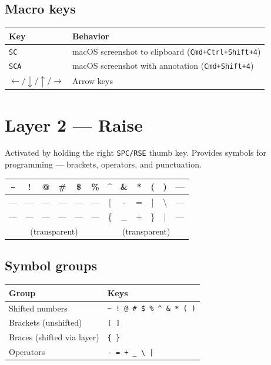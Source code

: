 \documentclass[11pt, letterpaper]{article}
\begin{document}
\subsection*{Macro keys}

\begin{tabular}{lp{9cm}}
\toprule
\textbf{Key} & \textbf{Behavior} \\
\midrule
\texttt{SC}  & macOS screenshot to clipboard (\texttt{Cmd+Ctrl+Shift+4}) \\
\texttt{SCA} & macOS screenshot with annotation (\texttt{Cmd+Shift+4}) \\
$\leftarrow / \downarrow / \uparrow / \rightarrow$ & Arrow keys \\
\bottomrule
\end{tabular}

\section{Layer 2 — Raise}

Activated by holding the right \texttt{SPC/RSE} thumb key. Provides
symbols for programming — brackets, operators, and punctuation.

\begin{center}
\renewcommand{\arraystretch}{1.4}
\begin{tabular}{|c|c|c|c|c|c||c|c|c|c|c|c|}
\hline
\texttt{\~{}} & ! & @ & \# & \$ & \% & \^{} & \& & * & ( & ) & --- \\
\hline
--- & --- & --- & --- & --- & --- & [ & - & = & ] & \textbackslash & --- \\
\hline
--- & --- & --- & --- & --- & --- & \{ & \_ & + & \} & | & --- \\
\hline
\multicolumn{6}{|c|}{(transparent)} &
\multicolumn{6}{c|}{(transparent)} \\
\hline
\end{tabular}
\end{center}

\subsection*{Symbol groups}

\begin{tabular}{ll}
\toprule
\textbf{Group}            & \textbf{Keys} \\
\midrule
Shifted numbers           & \texttt{\~{} ! @ \# \$ \% \^{} \& * ( )} \\
Brackets (unshifted)      & \texttt{[ ]} \\
Braces (shifted via layer)& \texttt{\{ \}} \\
Operators                 & \texttt{- = + \_ \textbackslash{} |} \\
\bottomrule
\end{tabular}
\end{document}
